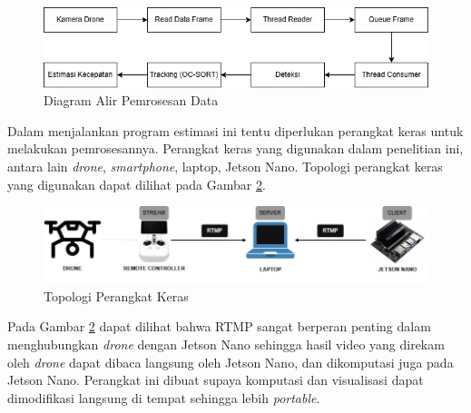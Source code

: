 \begin{figure} [H] \centering
  \includegraphics[scale=0.7]{bab3/algoritma.jpg}
  \caption{Diagram Alir Pemrosesan Data}
  \label{fig:diagramproses}
\end{figure}

Dalam menjalankan program estimasi ini tentu diperlukan perangkat keras untuk melakukan pemrosesannya. Perangkat keras yang digunakan dalam penelitian ini, antara lain \emph{drone}, \emph{smartphone}, laptop, Jetson Nano. Topologi perangkat keras yang digunakan dapat dilihat pada Gambar \ref{fig:topologihardware}.

\begin{figure} [H] \centering
  \includegraphics[scale=0.5]{bab3/topologi-hardware.jpg}
  \caption{Topologi Perangkat Keras}
  \label{fig:topologihardware}
\end{figure}

Pada Gambar \ref{fig:topologihardware} dapat dilihat bahwa RTMP sangat berperan penting dalam menghubungkan \emph{drone} dengan Jetson Nano sehingga hasil video yang direkam oleh \emph{drone} dapat dibaca langsung oleh Jetson Nano, dan dikomputasi juga pada Jetson Nano. Perangkat ini dibuat supaya komputasi dan visualisasi dapat dimodifikasi langsung di tempat sehingga lebih \emph{portable}.





